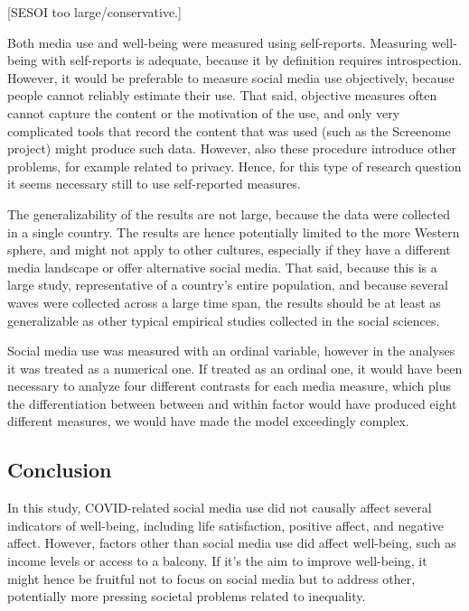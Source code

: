 \documentclass[
  english,
  man,floatsintext]{apa6}
\begin{document}
{[}SESOI too large/conservative.{]}

Both media use and well-being were measured using self-reports.
Measuring well-being with self-reports is adequate, because it by definition requires introspection.
However, it would be preferable to measure social media use objectively, because people cannot reliably estimate their use.
That said, objective measures often cannot capture the content or the motivation of the use, and only very complicated tools that record the content that was used (such as the Screenome project) might produce such data.
However, also these procedure introduce other problems, for example related to privacy.
Hence, for this type of research question it seems necessary still to use self-reported measures.

The generalizability of the results are not large, because the data were collected in a single country.
The results are hence potentially limited to the more Western sphere, and might not apply to other cultures, especially if they have a different media landscape or offer alternative social media.
That said, because this is a large study, representative of a country's entire population, and because several waves were collected across a large time span, the results should be at least as generalizable as other typical empirical studies collected in the social sciences.

Social media use was measured with an ordinal variable, however in the analyses it was treated as a numerical one.
If treated as an ordinal one, it would have been necessary to analyze four different contrasts for each media measure, which plus the differentiation between between and within factor would have produced eight different measures, we would have made the model exceedingly complex.

\hypertarget{conclusion}{%
\subsection{Conclusion}\label{conclusion}}

In this study, COVID-related social media use did not causally affect several indicators of well-being, including life satisfaction, positive affect, and negative affect.
However, factors other than social media use did affect well-being, such as income levels or access to a balcony.
If it's the aim to improve well-being, it might hence be fruitful not to focus on social media but to address other, potentially more pressing societal problems related to inequality.
\end{document}
